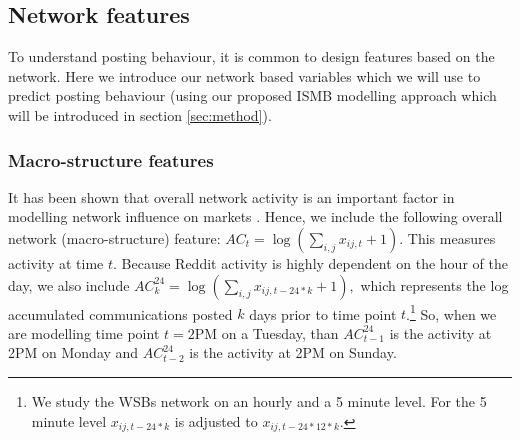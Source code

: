 
\subsection{Network features} \label{sec:networkfeatures}

To understand posting behaviour, it is common to design features based on the network. Here we introduce our network based variables which we will use to predict posting behaviour (using our proposed ISMB modelling approach which will be introduced in section \ref{sec:method}). 

\subsubsection*{Macro-structure features}
It has been shown that overall network activity is an important factor in modelling network influence on markets \parencite{Audrino2020, Gan2020, Jiao2020}. %
Hence, we include the following overall network (macro-structure) feature:
$
AC_{t} = \log(\sum_{i,j} x_{ij,t} + 1). 
$ %
This measures activity at time $t$. Because Reddit activity is highly dependent on the hour of the day, we also include $	AC^{24}_{k} = \log(\sum_{i,j} x_{ij,t-24*k} + 1), $ %
which represents the log accumulated communications posted $k$ days prior to time point $t$.\footnote{We study the WSBs network on an hourly and a 5 minute level. For the 5 minute level $x_{ij,t-24*k}$ is adjusted to $x_{ij,t-24*12*k}$.} So, when we are modelling time point $t=2$PM on a Tuesday, than $AC^{24}_{t-1}$ is the activity at 2PM on Monday and $AC^{24}_{t-2}$ is the activity at 2PM on Sunday. %

